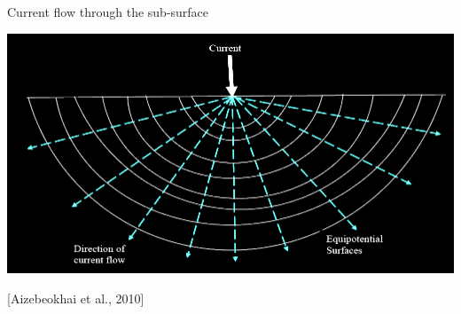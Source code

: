 \begin{frame}{Current flow through the sub-surface}
    \begin{center}
     \includegraphics[width=0.7\linewidth]{Figures/Resistivity/OneElectrodeHomoHalfspace_Aizebeokhai_SResanEss2010.png}
 
     \tiny[Aizebeokhai et al., 2010]
   \end{center}
 \end{frame}



